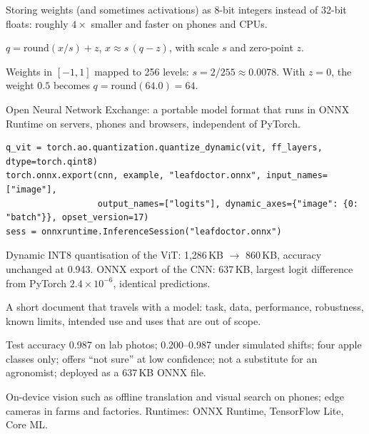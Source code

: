 \documentclass[11pt,a4paper]{article}
\begin{document}
\begin{bdef}[Quantisation]
Storing weights (and sometimes activations) as 8-bit integers instead of 32-bit floats: roughly $4\times$ smaller and faster on phones and CPUs.
\end{bdef}
\begin{bmath}
$q=\mathrm{round}(x/s)+z$, \;$x\approx s\,(q-z)$, with scale $s$ and zero-point $z$.
\end{bmath}
\begin{bex}[Example]
Weights in $[-1,1]$ mapped to 256 levels: $s=2/255\approx0.0078$. With $z=0$, the weight $0.5$ becomes $q=\mathrm{round}(64.0)=64$.
\end{bex}
\begin{bdef}[ONNX]
Open Neural Network Exchange: a portable model format that runs in ONNX Runtime on servers, phones and browsers, independent of PyTorch.
\end{bdef}
\begin{bcode}
\begin{lstlisting}
q_vit = torch.ao.quantization.quantize_dynamic(vit, ff_layers, dtype=torch.qint8)
torch.onnx.export(cnn, example, "leafdoctor.onnx", input_names=["image"],
                  output_names=["logits"], dynamic_axes={"image": {0: "batch"}}, opset_version=17)
sess = onnxruntime.InferenceSession("leafdoctor.onnx")
\end{lstlisting}
\end{bcode}
\begin{bres}
Dynamic INT8 quantisation of the ViT: 1,286\,KB $\rightarrow$ 860\,KB, accuracy unchanged at 0.943. ONNX export of the CNN: 637\,KB, largest logit difference from PyTorch $2.4\times10^{-6}$, identical predictions.
\end{bres}

\begin{bdef}
A short document that travels with a model: task, data, performance, robustness, known limits, intended use and uses that are out of scope.
\end{bdef}
\begin{bex}
Test accuracy 0.987 on lab photos; 0.200--0.987 under simulated shifts; four apple classes only; offers ``not sure'' at low confidence; not a substitute for an agronomist; deployed as a 637\,KB ONNX file.
\end{bex}
\begin{bapp}
On-device vision such as offline translation and visual search on phones; edge cameras in farms and factories. Runtimes: ONNX Runtime, TensorFlow Lite, Core ML.
\end{bapp}
\end{document}
